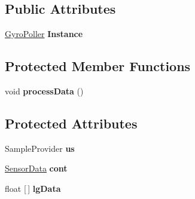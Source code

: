 \subsection*{Public Attributes}
\begin{DoxyCompactItemize}
\item 
\mbox{\label{classca_1_1mcgill_1_1ecse211_1_1threads_1_1_gyro_poller_a181979440aafff52b0ba5aaff9064f80}} 
\hyperlink{classca_1_1mcgill_1_1ecse211_1_1threads_1_1_gyro_poller}{Gyro\+Poller} {\bfseries Instance}
\end{DoxyCompactItemize}
\subsection*{Protected Member Functions}
\begin{DoxyCompactItemize}
\item 
\mbox{\label{classca_1_1mcgill_1_1ecse211_1_1threads_1_1_gyro_poller_a27f914ed77f23805210998fc0ee2daa7}} 
void {\bfseries process\+Data} ()
\end{DoxyCompactItemize}
\subsection*{Protected Attributes}
\begin{DoxyCompactItemize}
\item 
\mbox{\label{classca_1_1mcgill_1_1ecse211_1_1threads_1_1_gyro_poller_af478329ec7a335a4f3d2d412d5d10091}} 
Sample\+Provider {\bfseries us}
\item 
\mbox{\label{classca_1_1mcgill_1_1ecse211_1_1threads_1_1_gyro_poller_a90507a3d6038ff7ec7881640b5dd4263}} 
\hyperlink{classca_1_1mcgill_1_1ecse211_1_1threads_1_1_sensor_data}{Sensor\+Data} {\bfseries cont}
\item 
\mbox{\label{classca_1_1mcgill_1_1ecse211_1_1threads_1_1_gyro_poller_a112e433b3561e89927357051f55f8cf1}} 
float \mbox{[}$\,$\mbox{]} {\bfseries lg\+Data}
\end{DoxyCompactItemize}


